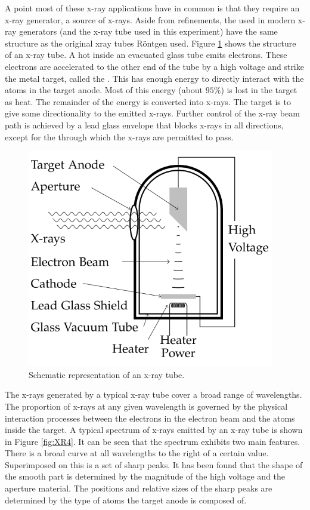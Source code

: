 \noindent A point most of these x-ray applications have in common is that they require an x-ray generator, a source of x-rays. Aside from refinements, the  used in modern x-ray generators (and the x-ray tube used in this experiment) have the same structure as the original xray tubes Röntgen used. Figure \ref{fig:XR3} shows the structure of an x-ray tube. A hot  inside an evacuated glass tube emits electrons. These electrons are accelerated to the other end of the tube by a high voltage and strike the metal target, called the . This  has enough energy to directly interact with the atoms in the target anode. Most of this energy (about $95\%$) is lost in the target as heat. The remainder of the energy is converted into x-rays. The target is  to give some directionality to the emitted x-rays. Further control of the x-ray beam path is achieved by a lead glass envelope that blocks x-rays in all directions, except for the  through which the x-rays are permitted to pass.

\begin{figure}[H]
    \centering
    \includegraphics[scale = 0.8]{Images/XR3.PNG}
    \caption{Schematic representation of an x-ray tube.}
    \label{fig:XR3}
\end{figure}

\noindent The x-rays generated by a typical x-ray tube cover a broad range of wavelengths. The proportion of x-rays at any given wavelength is governed by the physical interaction processes between the electrons in the electron beam and the atoms inside the target. A typical spectrum of x-rays emitted by an x-ray tube is shown in Figure \ref{fig:XR4}. It can be seen that the spectrum exhibits two main features. There is a broad curve at all wavelengths to the right of a certain value. Superimposed on this is a set of sharp peaks. It has been found that the shape of the smooth part is determined by the magnitude of the high voltage and the aperture material. The positions and relative sizes of the sharp peaks are determined by the type of atoms the target anode is composed of.

